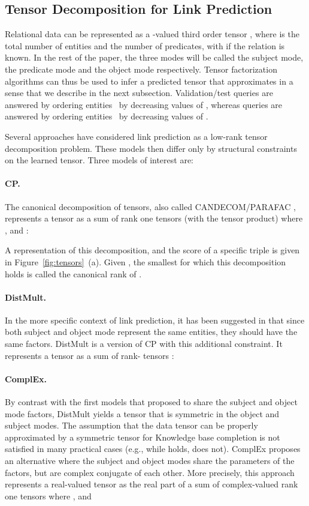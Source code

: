 \documentclass{article}
\newcommand{\CP}{{CP}\xspace}
\newcommand{\complex}{{ComplEx}\xspace}
\newcommand{\distmult}{{DistMult}\xspace}
\begin{document}
\subsection{Tensor Decomposition for Link Prediction}

Relational data can be represented as a -valued third order tensor , where  is the total number of entities and  the number of predicates, with  if the relation  is known. In the rest of the paper, the three modes will be called the subject mode, the predicate mode and the object mode respectively. Tensor factorization algorithms can thus be used to infer a predicted tensor  that approximates  in a sense that we describe in the next subsection. Validation/test queries  are answered by ordering entities~ by decreasing values of , whereas queries  are answered by ordering entities~ by decreasing values of .

Several approaches have considered link prediction as a low-rank tensor decomposition problem. These models then differ only by structural constraints on the learned tensor. Three models of interest are:

\paragraph{\CP.} The canonical decomposition of tensors, also called CANDECOM/PARAFAC \citep{hitchcock_expression_1927}, represents a tensor  as a sum of  rank one tensors  (with  the tensor product) where , and :

A representation of this decomposition, and the score of a specific triple is given in Figure~\ref{fig:tensors}~(a).
Given , the smallest  for which this decomposition holds is called the canonical rank of . 

\paragraph{\distmult.} In the more specific context of link prediction, it has been suggested in \citet{bordes_learning_2011,nickel_three-way_2011} that since both subject and object mode represent the same entities, they should have the same factors. \distmult \citep{yang_embedding_2014} is a version of \CP with this additional constraint. It represents a tensor  as a sum of rank- tensors :

\paragraph{\complex.} By contrast with the first models that proposed to share the subject and object mode factors, \distmult yields a tensor that is symmetric in the object and subject modes. The assumption that the data tensor can be properly approximated by a symmetric tensor for Knowledge base completion is not satisfied in many practical cases (e.g., while  holds,  does not). \complex \citep{trouillon_complex_2016} proposes an alternative where the subject and object modes share the parameters of the factors, but are complex conjugate of each other. More precisely, this approach represents a real-valued tensor  as the real part of a sum of  complex-valued rank one tensors  where , and 
\end{document}

